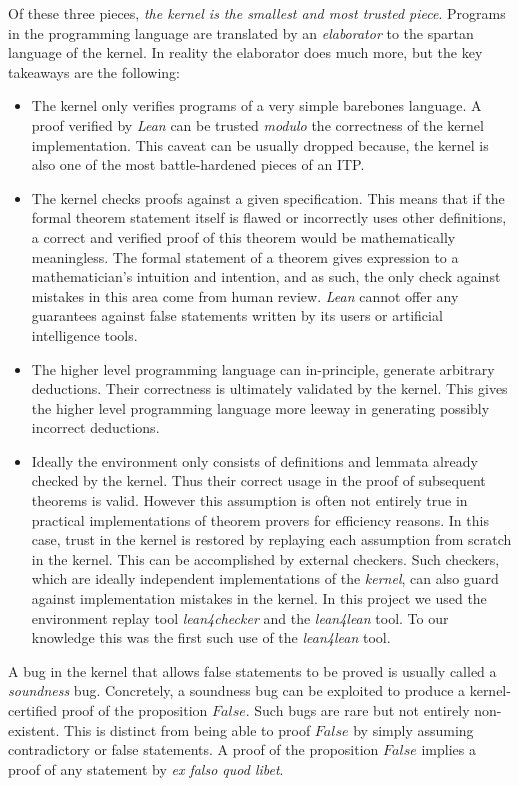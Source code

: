 Of these three pieces, \emph{the kernel is the smallest and most trusted piece}. Programs in the programming language are translated by an \emph{elaborator} to the spartan language of the kernel. In reality the elaborator does much more, but the key takeaways are the following:
\begin{itemize}
    \item The kernel only verifies programs of a very simple barebones language. A proof verified by \emph{Lean} can be trusted \emph{modulo} the correctness of the kernel implementation. This caveat can be usually dropped because, the kernel is also one of the most battle-hardened pieces of an ITP.
    \item The kernel checks proofs against a given specification. This means that if the formal theorem statement itself is flawed or incorrectly uses other definitions, a correct and verified proof of this theorem would be mathematically meaningless. The formal statement of a theorem gives expression to a mathematician's intuition and intention, and as such, the only check against mistakes in this area come from human review. \emph{Lean} cannot offer any guarantees against false statements written by its users or artificial intelligence tools.
    \item The higher level programming language can in-principle, generate arbitrary deductions. Their correctness is ultimately validated by the kernel. This gives the higher level programming language more leeway in generating possibly incorrect deductions.
    \item Ideally the environment only consists of definitions and lemmata already checked by the kernel. Thus their correct usage in the proof of subsequent theorems is valid. However this assumption is often not entirely true in practical implementations of theorem provers for efficiency reasons. In this case, trust in the kernel is restored by replaying each assumption from scratch in the kernel. This can be accomplished by external checkers. Such checkers, which are ideally independent implementations of the \emph{kernel}, can also guard against implementation mistakes in the kernel. In this project we used the environment replay tool \textit{lean4checker} and the \textit{lean4lean} \cite{lean4lean} tool. To our knowledge this was the first such use of the \textit{lean4lean} tool.

\end{itemize}

\begin{remark}
    A bug in the kernel that allows false statements to be proved is usually called a \emph{soundness} bug. Concretely, a soundness bug can be exploited to produce a kernel-certified proof of the proposition $False$. Such bugs are rare but not entirely non-existent. This is distinct from being able to proof $False$ by simply assuming contradictory or false statements. A proof of the proposition $False$ implies a proof of any statement by \emph{ex falso quod libet}.
\end{remark}


